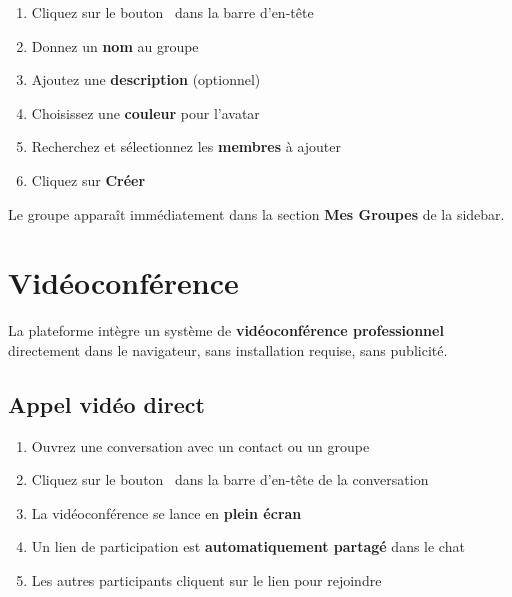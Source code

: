 \documentclass[12pt,a4paper]{article}
\begin{document}
\begin{etapebox}
\begin{enumerate}[leftmargin=1.5em]
    \item Cliquez sur le bouton \faUsersCog\ dans la barre d'en-tête
    \item Donnez un \textbf{nom} au groupe
    \item Ajoutez une \textbf{description} (optionnel)
    \item Choisissez une \textbf{couleur} pour l'avatar
    \item Recherchez et sélectionnez les \textbf{membres} à ajouter
    \item Cliquez sur \textbf{Créer}
\end{enumerate}
\end{etapebox}

Le groupe apparaît immédiatement dans la section \textbf{Mes Groupes} de la sidebar.

\section{Vidéoconférence}

La plateforme intègre un système de \textbf{vidéoconférence professionnel} directement dans le navigateur, sans installation requise, sans publicité.

\subsection{Appel vidéo direct}

\begin{etapebox}
\begin{enumerate}[leftmargin=1.5em]
    \item Ouvrez une conversation avec un contact ou un groupe
    \item Cliquez sur le bouton \faVideo\ dans la barre d'en-tête de la conversation
    \item La vidéoconférence se lance en \textbf{plein écran}
    \item Un lien de participation est \textbf{automatiquement partagé} dans le chat
    \item Les autres participants cliquent sur le lien pour rejoindre
\end{enumerate}
\end{etapebox}
\end{document}
